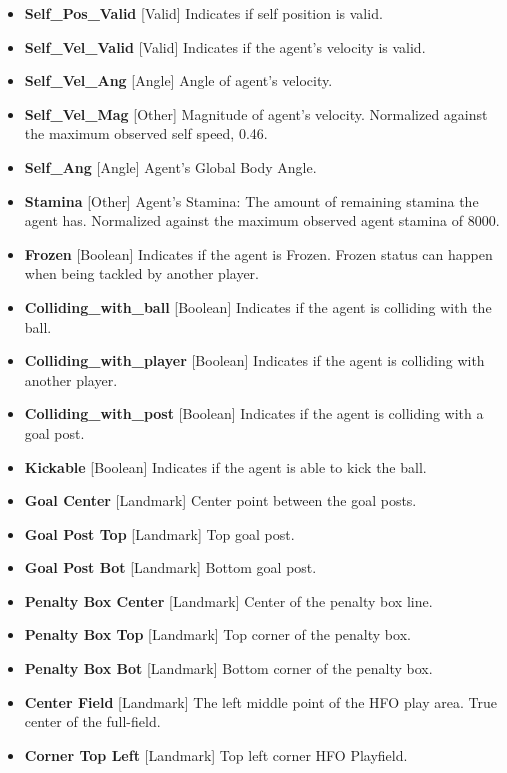 \documentclass[12pt]{article}
\begin{document}
\begin{itemize}
  \item{\textbf{Self\_Pos\_Valid} [Valid] Indicates if self position is valid.}
  \item{\textbf{Self\_Vel\_Valid} [Valid] Indicates if the agent's velocity is valid.}
  \item{\textbf{Self\_Vel\_Ang} [Angle] Angle of agent's velocity.}
  \item{\textbf{Self\_Vel\_Mag} [Other] Magnitude of agent's
    velocity. Normalized against the maximum observed self speed,
    0.46.}
  \item{\textbf{Self\_Ang} [Angle] Agent's Global Body Angle.}
  \item{\textbf{Stamina} [Other] Agent's Stamina: The amount of remaining stamina the
    agent has. Normalized against the maximum observed agent stamina
    of 8000.}
  \item{\textbf{Frozen} [Boolean] Indicates if the agent is Frozen. Frozen status can
    happen when being tackled by another player.}
  \item{\textbf{Colliding\_with\_ball} [Boolean] Indicates if the agent
    is colliding with the ball.}
  \item{\textbf{Colliding\_with\_player} [Boolean] Indicates if the agent
    is colliding with another player.}
  \item{\textbf{Colliding\_with\_post} [Boolean] Indicates if the agent
    is colliding with a goal post.}
  \item{\textbf{Kickable} [Boolean] Indicates if the agent is able to
    kick the ball.}
  \item{\textbf{Goal Center} [Landmark] Center point between the goal posts.}
  \item{\textbf{Goal Post Top} [Landmark] Top goal post.}
  \item{\textbf{Goal Post Bot} [Landmark] Bottom goal post.}
  \item{\textbf{Penalty Box Center} [Landmark] Center of the penalty box line.}
  \item{\textbf{Penalty Box Top} [Landmark] Top corner of the penalty box.}
  \item{\textbf{Penalty Box Bot} [Landmark] Bottom corner of the penalty box.}
  \item{\textbf{Center Field} [Landmark] The left middle point of the
    HFO play area. True center of the full-field.}
  \item{\textbf{Corner Top Left} [Landmark] Top left corner HFO Playfield.}

\end{itemize}
\end{document}

